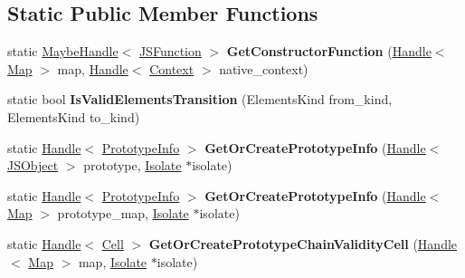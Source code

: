 \subsection*{Static Public Member Functions}
\begin{DoxyCompactItemize}
\item 
static \hyperlink{classv8_1_1internal_1_1_maybe_handle}{Maybe\+Handle}$<$ \hyperlink{classv8_1_1internal_1_1_j_s_function}{J\+S\+Function} $>$ {\bfseries Get\+Constructor\+Function} (\hyperlink{classv8_1_1internal_1_1_handle}{Handle}$<$ \hyperlink{classv8_1_1internal_1_1_map}{Map} $>$ map, \hyperlink{classv8_1_1internal_1_1_handle}{Handle}$<$ \hyperlink{classv8_1_1internal_1_1_context}{Context} $>$ native\+\_\+context)\hypertarget{classv8_1_1internal_1_1_map_aec39f61fb942c137611b696e8160ccf3}{}\label{classv8_1_1internal_1_1_map_aec39f61fb942c137611b696e8160ccf3}

\item 
static bool {\bfseries Is\+Valid\+Elements\+Transition} (Elements\+Kind from\+\_\+kind, Elements\+Kind to\+\_\+kind)\hypertarget{classv8_1_1internal_1_1_map_a99c79634f2625e3c5d8a174897bd0374}{}\label{classv8_1_1internal_1_1_map_a99c79634f2625e3c5d8a174897bd0374}

\item 
static \hyperlink{classv8_1_1internal_1_1_handle}{Handle}$<$ \hyperlink{classv8_1_1internal_1_1_prototype_info}{Prototype\+Info} $>$ {\bfseries Get\+Or\+Create\+Prototype\+Info} (\hyperlink{classv8_1_1internal_1_1_handle}{Handle}$<$ \hyperlink{classv8_1_1internal_1_1_j_s_object}{J\+S\+Object} $>$ prototype, \hyperlink{classv8_1_1internal_1_1_isolate}{Isolate} $\ast$isolate)\hypertarget{classv8_1_1internal_1_1_map_ad46f71a48ede55c74fa437f86c4e7d5a}{}\label{classv8_1_1internal_1_1_map_ad46f71a48ede55c74fa437f86c4e7d5a}

\item 
static \hyperlink{classv8_1_1internal_1_1_handle}{Handle}$<$ \hyperlink{classv8_1_1internal_1_1_prototype_info}{Prototype\+Info} $>$ {\bfseries Get\+Or\+Create\+Prototype\+Info} (\hyperlink{classv8_1_1internal_1_1_handle}{Handle}$<$ \hyperlink{classv8_1_1internal_1_1_map}{Map} $>$ prototype\+\_\+map, \hyperlink{classv8_1_1internal_1_1_isolate}{Isolate} $\ast$isolate)\hypertarget{classv8_1_1internal_1_1_map_ab604d3bbf94c9e677e6985d811d6e291}{}\label{classv8_1_1internal_1_1_map_ab604d3bbf94c9e677e6985d811d6e291}

\item 
static \hyperlink{classv8_1_1internal_1_1_handle}{Handle}$<$ \hyperlink{classv8_1_1internal_1_1_cell}{Cell} $>$ {\bfseries Get\+Or\+Create\+Prototype\+Chain\+Validity\+Cell} (\hyperlink{classv8_1_1internal_1_1_handle}{Handle}$<$ \hyperlink{classv8_1_1internal_1_1_map}{Map} $>$ map, \hyperlink{classv8_1_1internal_1_1_isolate}{Isolate} $\ast$isolate)\hypertarget{classv8_1_1internal_1_1_map_ab49b124261606e1c8b420bd9486fb282}{}\label{classv8_1_1internal_1_1_map_ab49b124261606e1c8b420bd9486fb282}


\end{DoxyCompactItemize}
